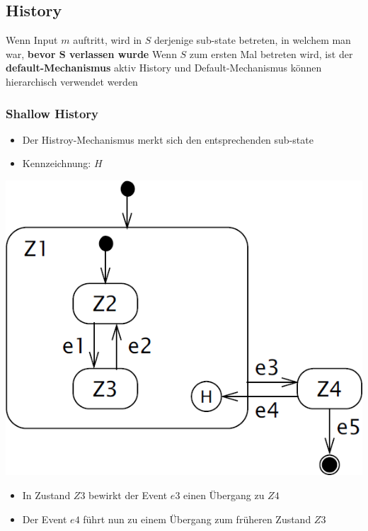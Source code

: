 \subsection{History}

\begin{outline}
    \1 Wenn Input $m$ auftritt, wird in $S$ derjenige sub-state betreten, in welchem man war, \textbf{bevor $\bm{S}$ verlassen wurde}
        \2 Wenn $S$ zum ersten Mal betreten wird, ist der \textbf{default-Mechanismus} aktiv
    \1 History und Default-Mechanismus können hierarchisch verwendet werden
\end{outline}


\subsubsection{Shallow History}

\begin{itemize}
    \item Der Histroy-Mechanismus merkt sich den entsprechenden sub-state
    \item Kennzeichnung: $H$
\end{itemize}



\begin{minipage}[c]{0.48\columnwidth}
    \includegraphics[width=\columnwidth]{images/statechart_shallow_history.png}
\end{minipage}
\hfill
\begin{minipage}[c]{0.48\columnwidth}
    \begin{itemize}
        \item In Zustand $Z3$ bewirkt der Event $e3$ einen Übergang zu $Z4$
        \item Der Event $e4$ führt nun zu einem Übergang zum früheren Zustand $Z3$
    \end{itemize}
\end{minipage}


